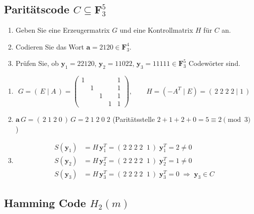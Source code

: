 \subsection{Paritätscode $C \subseteq \mathbf{F}_3^5$}

\begin{aufgabe}[5\_2]
\begin{enumerate}[label=\alph*)]
\item Geben Sie eine Erzeugermatrix $G$ und eine Kontrollmatrix $H$ für $C$ an.
\item Codieren Sie das Wort $\mathbf{a} = 2120 \in \mathbf{F}_3^4$.
\item Prüfen Sie, ob $\mathbf{y}_1 = 22120$, $\mathbf{y}_2 = 11022$, $\mathbf{y}_3 = 11111 \in \mathbf{F}_3^5$ Codewörter sind.
\end{enumerate}
\end{aufgabe}

\begin{loesung}
\begin{enumerate}[label=\alph*)]
\item
\[
G = (\,E \mid A\,) =
\begin{pmatrix}
1 & & & & 1\\
& 1 & & & 1\\
& & 1 & & 1\\
& & & 1 & 1
\end{pmatrix}, \qquad
H = (-A^T \mid E) = (\,2\;2\;2\;2 \mid 1\,)
\]
\item $\mathbf{a}\,G = (\,2\;1\;2\;0\,)\,G = 2\;1\;2\;0\;2$ \quad (Paritätsstelle $2+1+2+0 = 5 \equiv 2 \pmod{3}$)
\item
\begin{align*}
S(\mathbf{y}_1) &= H\,\mathbf{y}_1^T = (\,2\;2\;2\;2\;\;1\,)\;\mathbf{y}_1^T = 2 \ne 0\\
S(\mathbf{y}_2) &= H\,\mathbf{y}_2^T = (\,2\;2\;2\;2\;\;1\,)\;\mathbf{y}_2^T = 1 \ne 0\\
S(\mathbf{y}_3) &= H\,\mathbf{y}_3^T = (\,2\;2\;2\;2\;\;1\,)\;\mathbf{y}_3^T = 0 \;\Rightarrow\; \mathbf{y}_3 \in C
\end{align*}
\end{enumerate}
\end{loesung}

\subsection{Hamming Code $H_2(m)$}


